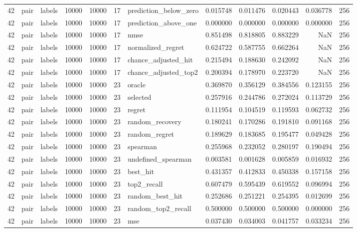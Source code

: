 \begin{tabular}{rllrrrlrrrrr}
42 & pair & labels & 10000 & 10000 & 17 & prediction_below_zero & 0.015748 & 0.011476 & 0.020443 & 0.036778 & 256 \\
42 & pair & labels & 10000 & 10000 & 17 & prediction_above_one & 0.000000 & 0.000000 & 0.000000 & 0.000000 & 256 \\
42 & pair & labels & 10000 & 10000 & 17 & nmse & 0.851498 & 0.818805 & 0.883229 & NaN & 256 \\
42 & pair & labels & 10000 & 10000 & 17 & normalized_regret & 0.624722 & 0.587755 & 0.662264 & NaN & 256 \\
42 & pair & labels & 10000 & 10000 & 17 & chance_adjusted_hit & 0.215494 & 0.188630 & 0.242092 & NaN & 256 \\
42 & pair & labels & 10000 & 10000 & 17 & chance_adjusted_top2 & 0.200394 & 0.178970 & 0.223720 & NaN & 256 \\
42 & pair & labels & 10000 & 10000 & 23 & oracle & 0.369870 & 0.356129 & 0.384556 & 0.123155 & 256 \\
42 & pair & labels & 10000 & 10000 & 23 & selected & 0.257916 & 0.244786 & 0.272024 & 0.113729 & 256 \\
42 & pair & labels & 10000 & 10000 & 23 & regret & 0.111954 & 0.104519 & 0.119593 & 0.062732 & 256 \\
42 & pair & labels & 10000 & 10000 & 23 & random_recovery & 0.180241 & 0.170286 & 0.191810 & 0.091168 & 256 \\
42 & pair & labels & 10000 & 10000 & 23 & random_regret & 0.189629 & 0.183685 & 0.195477 & 0.049428 & 256 \\
42 & pair & labels & 10000 & 10000 & 23 & spearman & 0.255968 & 0.232052 & 0.280197 & 0.190494 & 256 \\
42 & pair & labels & 10000 & 10000 & 23 & undefined_spearman & 0.003581 & 0.001628 & 0.005859 & 0.016932 & 256 \\
42 & pair & labels & 10000 & 10000 & 23 & best_hit & 0.431357 & 0.412833 & 0.450338 & 0.157158 & 256 \\
42 & pair & labels & 10000 & 10000 & 23 & top2_recall & 0.607479 & 0.595439 & 0.619552 & 0.096994 & 256 \\
42 & pair & labels & 10000 & 10000 & 23 & random_best_hit & 0.252686 & 0.251221 & 0.254395 & 0.012699 & 256 \\
42 & pair & labels & 10000 & 10000 & 23 & random_top2_recall & 0.500000 & 0.500000 & 0.500000 & 0.000000 & 256 \\
42 & pair & labels & 10000 & 10000 & 23 & mse & 0.037430 & 0.034003 & 0.041757 & 0.033234 & 256 \\

\end{tabular}

